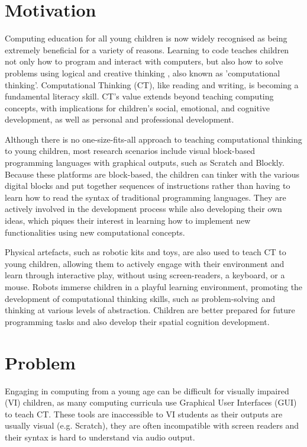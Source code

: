 \documentclass[oneside,%
                    author={Malak Hajji},
                    degree={BSc},
                    title={Designing An Accessible Ozobot Programming Platform for Students},
                  subtitle={With Mixed Visual Abilities}]{dissertation}
\begin{document}
\section{Motivation}
Computing education for all young children is now widely recognised as being extremely beneficial for a variety of reasons. Learning to code teaches children not only how to program and interact with computers, but also how to solve problems using logical and creative thinking \cite{CB-intro1}, also known as 'computational thinking'. Computational Thinking (CT), like reading and writing, is becoming a fundamental literacy skill. CT's value extends beyond teaching computing concepts, with implications for children's social, emotional, and cognitive development\cite{intro,cognition-intro}, as well as personal and professional development\cite{CB-CT1}. 

Although there is no one-size-fits-all approach to teaching computational thinking to young children, most research scenarios include visual block-based programming languages with graphical outputs, such as Scratch\cite{scratch} and Blockly\cite{blockly}. Because these platforms are block-based, the children can tinker with the various digital blocks and put together sequences of instructions rather than having to learn how to read the syntax of traditional programming languages. They are actively involved in the development process while also developing their own ideas, which piques their interest in learning how to implement new functionalities using new computational concepts.

Physical artefacts, such as robotic kits and toys, are also used to teach CT to young children, allowing them to actively engage with their environment and learn through interactive play, without using screen-readers, a keyboard, or a mouse. Robots immerse children in a playful learning environment, promoting the development of computational thinking skills, such as problem-solving and thinking at various levels of abstraction. Children are better prepared for future programming tasks and also develop their spatial cognition development\cite{intro-robots}.

\section{Problem}
Engaging in computing from a young age can be difficult for visually impaired (VI) children, as many computing curricula use Graphical User Interfaces (GUI) to teach CT. These tools are inaccessible to VI students as their outputs are usually visual (e.g. Scratch), they are often incompatible with screen readers and their syntax is hard to understand via audio output.
\end{document}
